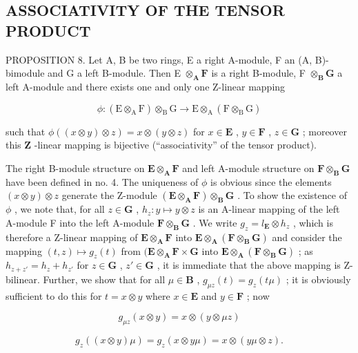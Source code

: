 \subsection{ASSOCIATIVITY OF THE TENSOR PRODUCT}

PROPOSITION 8. Let A, B be two rings, E a right A-module, F an (A, B)-bimodule and G a left B-module. Then E \(\otimes_{\mathbf{A}} \mathbf{F}\) is a right B-module, F \(\otimes_{\mathbf{B}} \mathbf{G}\) a left A-module and there exists one and only one Z-linear mapping

\[
\phi : (\mathrm{E} \otimes_ {\mathrm{A}} \mathrm{F}) \otimes_ {\mathrm{B}} \mathrm{G} \rightarrow \mathrm{E} \otimes_ {\mathrm{A}} (\mathrm{F} \otimes_ {\mathrm{B}} \mathrm{G})
\]

such that \(\phi((x \otimes y) \otimes z) = x \otimes (y \otimes z)\) for \(x \in \mathbf{E}\) , \(y \in \mathbf{F}\) , \(z \in \mathbf{G}\) ; moreover this \(\mathbf{Z}\) -linear mapping is bijective (``associativity'' of the tensor product).

The right B-module structure on \(\mathbf{E} \otimes_{\mathbf{A}} \mathbf{F}\) and left A-module structure on \(\mathbf{F} \otimes_{\mathbf{B}} \mathbf{G}\) have been defined in no. 4. The uniqueness of \(\phi\) is obvious since the elements \((x \otimes y) \otimes z\) generate the Z-module \((\mathbf{E} \otimes_{\mathbf{A}} \mathbf{F}) \otimes_{\mathbf{B}} \mathbf{G}\) . To show the existence of \(\phi\) , we note that, for all \(z \in \mathbf{G}\) , \(h_z: y \mapsto y \otimes z\) is an A-linear mapping of the left A-module F into the left A-module \(\mathbf{F} \otimes_{\mathbf{B}} \mathbf{G}\) . We write \(g_z = l_{\mathbf{E}} \otimes h_z\) , which is therefore a Z-linear mapping of \(\mathbf{E} \otimes_{\mathbf{A}} \mathbf{F}\) into \(\mathbf{E} \otimes_{\mathbf{A}} (\mathbf{F} \otimes_{\mathbf{B}} \mathbf{G})\) and consider the mapping \((t, z) \mapsto g_z(t)\) from \((\mathbf{E} \otimes_{\mathbf{A}} \mathbf{F} \times \mathbf{G}\) into \(\mathbf{E} \otimes_{\mathbf{A}} (\mathbf{F} \otimes_{\mathbf{B}} \mathbf{G})\) ; as \(h_{z+z'} = h_z + h_{z'}\) for \(z \in \mathbf{G}\) , \(z' \in \mathbf{G}\) , it is immediate that the above mapping is Z-bilinear. Further, we show that for all \(\mu \in \mathbf{B}\) , \(g_{\mu z}(t) = g_z(t\mu)\) ; it is obviously sufficient to do this for \(t = x \otimes y\) where \(x \in \mathbf{E}\) and \(y \in \mathbf{F}\) ; now

\[
g _ {\mu z} (x \otimes y) = x \otimes (y \otimes \mu z)
\]

\[
g _ {z} ((x \otimes y) \mu) = g _ {z} (x \otimes y \mu) = x \otimes (y \mu \otimes z).
\]

